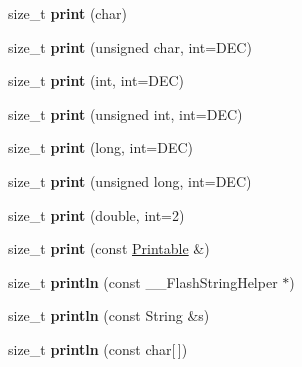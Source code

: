 \begin{DoxyCompactItemize}
\item 
size\+\_\+t {\bfseries print} (char)\hypertarget{class_print_a1e411d07a8ffec5faf7ce485bac0f029}{}\label{class_print_a1e411d07a8ffec5faf7ce485bac0f029}

\item 
size\+\_\+t {\bfseries print} (unsigned char, int=D\+EC)\hypertarget{class_print_a97bd44df9222fa4a51a1266fab8d3bc1}{}\label{class_print_a97bd44df9222fa4a51a1266fab8d3bc1}

\item 
size\+\_\+t {\bfseries print} (int, int=D\+EC)\hypertarget{class_print_a32cb3cf32d701c797b2b2d1080052dfe}{}\label{class_print_a32cb3cf32d701c797b2b2d1080052dfe}

\item 
size\+\_\+t {\bfseries print} (unsigned int, int=D\+EC)\hypertarget{class_print_a87275de35583868a370f43ce1c887750}{}\label{class_print_a87275de35583868a370f43ce1c887750}

\item 
size\+\_\+t {\bfseries print} (long, int=D\+EC)\hypertarget{class_print_ab1fb2a2384c7b9f628943f5046e7d1c1}{}\label{class_print_ab1fb2a2384c7b9f628943f5046e7d1c1}

\item 
size\+\_\+t {\bfseries print} (unsigned long, int=D\+EC)\hypertarget{class_print_a26a40be7a557c0bc391a15dce9f06954}{}\label{class_print_a26a40be7a557c0bc391a15dce9f06954}

\item 
size\+\_\+t {\bfseries print} (double, int=2)\hypertarget{class_print_ae8b4c025786c820afe0a90aeea01c9c5}{}\label{class_print_ae8b4c025786c820afe0a90aeea01c9c5}

\item 
size\+\_\+t {\bfseries print} (const \hyperlink{class_printable}{Printable} \&)\hypertarget{class_print_a901b0f06ae34aab31b8fbb4298f0596e}{}\label{class_print_a901b0f06ae34aab31b8fbb4298f0596e}

\item 
size\+\_\+t {\bfseries println} (const \+\_\+\+\_\+\+Flash\+String\+Helper $\ast$)\hypertarget{class_print_a4fd286b325d3b1a786cfa35072a8ef52}{}\label{class_print_a4fd286b325d3b1a786cfa35072a8ef52}

\item 
size\+\_\+t {\bfseries println} (const String \&s)\hypertarget{class_print_afd6cc6e2c1163f94c60855ad233899bd}{}\label{class_print_afd6cc6e2c1163f94c60855ad233899bd}

\item 
size\+\_\+t {\bfseries println} (const char\mbox{[}$\,$\mbox{]})\hypertarget{class_print_ad337ce3f7977411b7d34d47a51e5737e}{}\label{class_print_ad337ce3f7977411b7d34d47a51e5737e}


\end{DoxyCompactItemize}
